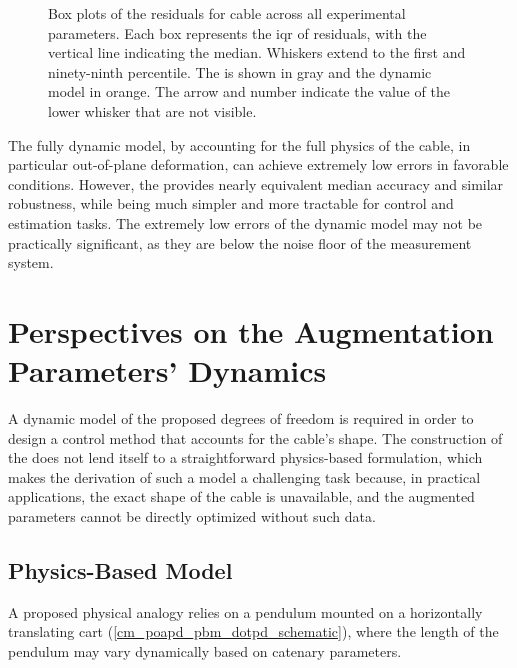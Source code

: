 \begin{figure}
	\centering
	\caption{
		Box plots of the residuals for cable  across all experimental
		parameters. Each box represents the \ac{iqr} of residuals, with the vertical line
		indicating the median. Whiskers extend to the first and ninety-ninth percentile. The
		\thetagammamodel{} is shown in gray and the dynamic model in orange. The arrow and number indicate
		the value of the lower whisker that are not visible.
	}
	\label{cm_acm_ev_sr_cables_boxplot_dynamic_diff}
\end{figure}

The fully dynamic model, by accounting for the full physics of the cable, in particular
out-of-plane deformation, can achieve extremely low errors in favorable conditions. However, the
\thetagammamodel{} provides nearly equivalent median accuracy and similar robustness, while being
much simpler and more tractable for control and estimation tasks. The extremely low errors of the
dynamic model may not be practically significant, as they are below the noise floor of the
measurement system.

\section{Perspectives on the Augmentation Parameters' Dynamics}
\label{cm_perspectives_on_augmentation_parameters_dynamics}

A dynamic model of the proposed degrees of freedom is required in order to design a control method
that accounts for the cable's shape. The construction of the \thetagammamodel{} does not lend
itself to a straightforward physics-based formulation, which makes the derivation of such a model a
challenging task because, in practical applications, the exact shape of the cable is unavailable,
and the augmented parameters cannot be directly optimized without such data.

\subsection{Physics-Based Model}
\label{cm_poapd_physics_based_model}

A proposed physical analogy relies on a pendulum mounted on a horizontally translating cart
(\cref{cm_poapd_pbm_dotpd_schematic}), where the length of the pendulum may vary dynamically based
on catenary parameters.

